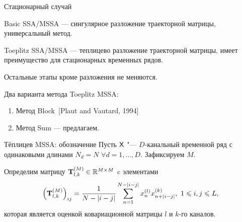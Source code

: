 \documentclass[ucs, notheorems, handout]{beamer}
\begin{document}
\begin{frame}{Стационарный случай}

Basic SSA/MSSA --- сингулярное разложение траекторной матрицы, универсальный метод.

\medskip
Toeplitz SSA/MSSA --- теплицево разложение траекторной матрицы, имеет преимущество для стационарных временных рядов. 	
	
\medskip
Остальные этапы кроме разложения не меняются.\medskip
	
	
	Два варианта метода Toeplitz MSSA:\medskip
	\begin{enumerate}
		\item Метод Block~[Plaut and Vautard, 1994]\medskip
		\item Метод Sum --- предлагаем.\medskip
	\end{enumerate}
	
\end{frame}
\begin{frame}{Тёплицев MSSA: обозначение}
	Пусть $\mathsf{X}$ "--- $D$-канальный временной ряд с одинаковыми длинами $N_d=N$ $\forall d=1,\ldots,D$. Зафиксируем $M$.\medskip
	
	Определим матрицу $\mathbf{T}_{l,k}^{(M)}\in \mathbb{R}^{M\times M}$ c элементами
	\begin{equation*}\label{eq:block_elements}
	\left(\mathbf{T}^{(M)}_{l,k}\right)_{ij}=\frac{1}{N-|i-j|}\sum_{n=1}^{N-|i-j|} x^{(l)}_nx^{(k)}_{n+|i-j|},\ 1\leqslant i,j\leqslant L,
	\end{equation*}
	которая является оценкой ковариационной матрицы $l$ и $k$-го каналов.
\end{frame}
\end{document}
